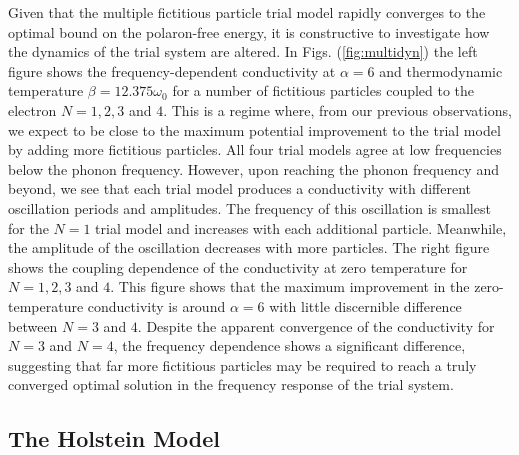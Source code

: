 Given that the multiple fictitious particle trial model rapidly converges to the optimal bound on the polaron-free energy, it is constructive to investigate how the dynamics of the trial system are altered. In Figs. (\ref{fig:multidyn}) the left figure shows the frequency-dependent conductivity at $\alpha = 6$ and thermodynamic temperature $\beta = 12.375 \omega_0$ for a number of fictitious particles coupled to the electron $N = 1, 2, 3$ and $4$. This is a regime where, from our previous observations, we expect to be close to the maximum potential improvement to the trial model by adding more fictitious particles. All four trial models agree at low frequencies below the phonon frequency. However, upon reaching the phonon frequency and beyond, we see that each trial model produces a conductivity with different oscillation periods and amplitudes. The frequency of this oscillation is smallest for the $N=1$ trial model and increases with each additional particle. Meanwhile, the amplitude of the oscillation decreases with more particles. The right figure shows the coupling dependence of the conductivity at zero temperature for $N=1, 2,3$ and $4$. This figure shows that the maximum improvement in the zero-temperature conductivity is around $\alpha = 6$ with little discernible difference between $N=3$ and $4$. Despite the apparent convergence of the conductivity for $N=3$ and $N=4$, the frequency dependence shows a significant difference, suggesting that far more fictitious particles may be required to reach a truly converged optimal solution in the frequency response of the trial system.

\subsection{The Holstein Model}

